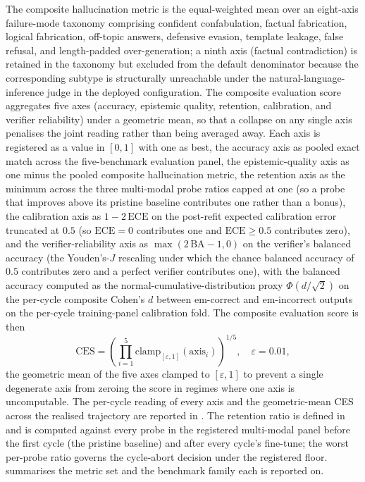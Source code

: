 The composite hallucination metric is the equal-weighted mean over an eight-axis failure-mode taxonomy comprising confident confabulation, factual fabrication, logical fabrication, off-topic answers, defensive evasion, template leakage, false refusal, and length-padded over-generation; a ninth axis (factual contradiction) is retained in the taxonomy but excluded from the default denominator because the corresponding subtype is structurally unreachable under the natural-language-inference judge in the deployed configuration. The composite evaluation score aggregates five axes (accuracy, epistemic quality, retention, calibration, and verifier reliability) under a geometric mean, so that a collapse on any single axis penalises the joint reading rather than being averaged away. Each axis is registered as a value in $[0, 1]$ with one as best, the accuracy axis as pooled exact match across the five-benchmark evaluation panel, the epistemic-quality axis as one minus the pooled composite hallucination metric, the retention axis as the minimum across the three multi-modal probe ratios capped at one (so a probe that improves above its pristine baseline contributes one rather than a bonus), the calibration axis as $1 - 2\,\mathrm{ECE}$ on the post-refit expected calibration error truncated at $0.5$ (so $\mathrm{ECE} = 0$ contributes one and $\mathrm{ECE} \ge 0.5$ contributes zero), and the verifier-reliability axis as $\max(2\,\mathrm{BA} - 1, 0)$ on the verifier's balanced accuracy (the Youden's-$J$ rescaling under which the chance balanced accuracy of $0.5$ contributes zero and a perfect verifier contributes one), with the balanced accuracy computed as the normal-cumulative-distribution proxy $\Phi(d / \sqrt{2})$ on the per-cycle composite Cohen's $d$ between em-correct and em-incorrect outputs on the per-cycle training-panel calibration fold. The composite evaluation score is then
\begin{equation}
\mathrm{CES} = \left(\prod_{i=1}^{5} \mathrm{clamp}_{[\varepsilon,1]}(\mathrm{axis}_i)\right)^{1/5},
\quad \varepsilon = 0.01,
\label{eq:ces}
\end{equation}
the geometric mean of the five axes clamped to $[\varepsilon, 1]$ to prevent a single degenerate axis from zeroing the score in regimes where one axis is uncomputable. The per-cycle reading of every axis and the geometric-mean CES across the realised trajectory are reported in . The retention ratio is defined in  and is computed against every probe in the registered multi-modal panel before the first cycle (the pristine baseline) and after every cycle's fine-tune; the worst per-probe ratio governs the cycle-abort decision under the registered floor.  summarises the metric set and the benchmark family each is reported on.


